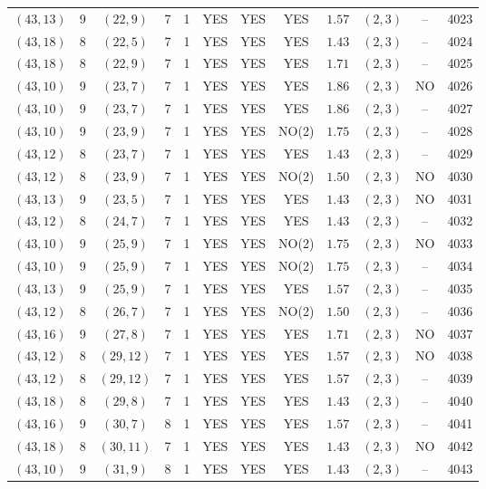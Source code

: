 \begin{longtable}{|c|c|c|c|c|c|c|c|c|c|c|c|}
$(43,13)$ & 9 & $(22,9)$ & 7 & 1 & YES & YES & YES & $1.57$ & $(2,3)$ & -- & 4023\\
$(43,18)$ & 8 & $(22,5)$ & 7 & 1 & YES & YES & YES & $1.43$ & $(2,3)$ & -- & 4024\\
$(43,18)$ & 8 & $(22,9)$ & 7 & 1 & YES & YES & YES & $1.71$ & $(2,3)$ & -- & 4025\\
$(43,10)$ & 9 & $(23,7)$ & 7 & 1 & YES & YES & YES & $1.86$ & $(2,3)$ & NO & 4026\\
$(43,10)$ & 9 & $(23,7)$ & 7 & 1 & YES & YES & YES & $1.86$ & $(2,3)$ & -- & 4027\\
$(43,10)$ & 9 & $(23,9)$ & 7 & 1 & YES & YES & NO(2) & $1.75$ & $(2,3)$ & -- & 4028\\
$(43,12)$ & 8 & $(23,7)$ & 7 & 1 & YES & YES & YES & $1.43$ & $(2,3)$ & -- & 4029\\
$(43,12)$ & 8 & $(23,9)$ & 7 & 1 & YES & YES & NO(2) & $1.50$ & $(2,3)$ & NO & 4030\\
$(43,13)$ & 9 & $(23,5)$ & 7 & 1 & YES & YES & YES & $1.43$ & $(2,3)$ & NO & 4031\\
$(43,12)$ & 8 & $(24,7)$ & 7 & 1 & YES & YES & YES & $1.43$ & $(2,3)$ & -- & 4032\\
$(43,10)$ & 9 & $(25,9)$ & 7 & 1 & YES & YES & NO(2) & $1.75$ & $(2,3)$ & NO & 4033\\
$(43,10)$ & 9 & $(25,9)$ & 7 & 1 & YES & YES & NO(2) & $1.75$ & $(2,3)$ & -- & 4034\\
$(43,13)$ & 9 & $(25,9)$ & 7 & 1 & YES & YES & YES & $1.57$ & $(2,3)$ & -- & 4035\\
$(43,12)$ & 8 & $(26,7)$ & 7 & 1 & YES & YES & NO(2) & $1.50$ & $(2,3)$ & -- & 4036\\
$(43,16)$ & 9 & $(27,8)$ & 7 & 1 & YES & YES & YES & $1.71$ & $(2,3)$ & NO & 4037\\
$(43,12)$ & 8 & $(29,12)$ & 7 & 1 & YES & YES & YES & $1.57$ & $(2,3)$ & NO & 4038\\
$(43,12)$ & 8 & $(29,12)$ & 7 & 1 & YES & YES & YES & $1.57$ & $(2,3)$ & -- & 4039\\
$(43,18)$ & 8 & $(29,8)$ & 7 & 1 & YES & YES & YES & $1.43$ & $(2,3)$ & -- & 4040\\
$(43,16)$ & 9 & $(30,7)$ & 8 & 1 & YES & YES & YES & $1.57$ & $(2,3)$ & -- & 4041\\
$(43,18)$ & 8 & $(30,11)$ & 7 & 1 & YES & YES & YES & $1.43$ & $(2,3)$ & NO & 4042\\
$(43,10)$ & 9 & $(31,9)$ & 8 & 1 & YES & YES & YES & $1.43$ & $(2,3)$ & -- & 4043\\

\end{longtable}
